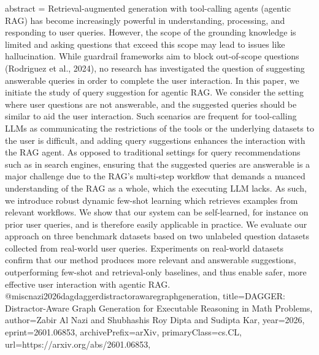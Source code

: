 {      abstract = {Retrieval-augmented generation with tool-calling agents (agentic RAG) has become increasingly powerful in understanding, processing, and responding to user queries. However, the scope of the grounding knowledge is limited and asking questions that exceed this scope may lead to issues like hallucination. While guardrail frameworks aim to block out-of-scope questions (Rodriguez et al., 2024), no research has investigated the question of suggesting answerable queries in order to complete the user interaction.   In this paper, we initiate the study of query suggestion for agentic RAG. We consider the setting where user questions are not answerable, and the suggested queries should be similar to aid the user interaction. Such scenarios are frequent for tool-calling LLMs as communicating the restrictions of the tools or the underlying datasets to the user is difficult, and adding query suggestions enhances the interaction with the RAG agent. As opposed to traditional settings for query recommendations such as in search engines, ensuring that the suggested queries are answerable is a major challenge due to the RAG's multi-step workflow that demands a nuanced understanding of the RAG as a whole, which the executing LLM lacks. As such, we introduce robust dynamic few-shot learning which retrieves examples from relevant workflows. We show that our system can be self-learned, for instance on prior user queries, and is therefore easily applicable in practice. We evaluate our approach on three benchmark datasets based on two unlabeled question datasets collected from real-world user queries. Experiments on real-world datasets confirm that our method produces more relevant and answerable suggestions, outperforming few-shot and retrieval-only baselines, and thus enable safer, more effective user interaction with agentic RAG.}
}@misc{nazi2026dagdaggerdistractorawaregraphgeneration,
      title={{\dag}DAGGER: Distractor-Aware Graph Generation for Executable Reasoning in Math Problems}, 
      author={Zabir Al Nazi and Shubhashis Roy Dipta and Sudipta Kar},
      year={2026},
      eprint={2601.06853},
      archivePrefix={arXiv},
      primaryClass={cs.CL},
      url={https://arxiv.org/abs/2601.06853},
}
